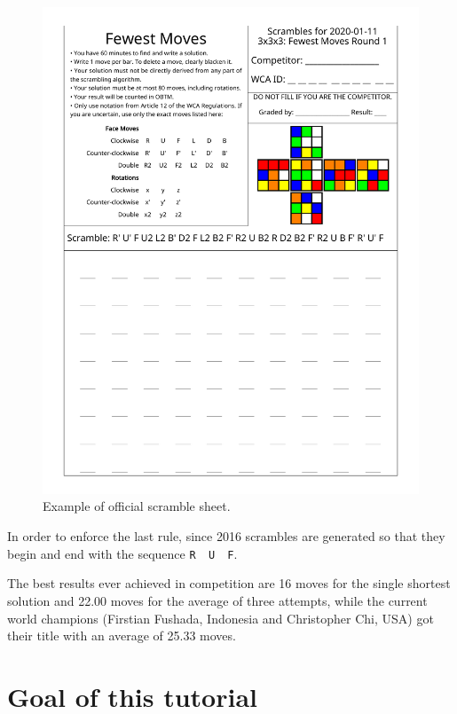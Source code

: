 \documentclass[11pt,a4paper]{book}
\newcommand{\p}{\textquotesingle}
\newcommand{\m}{\texttt}
\newcommand{\ps}{\p\,\,}
\begin{document}
\begin{figure}
\begin{center}
\includegraphics[scale=0.7]{img/example.pdf}
\end{center}
\caption{Example of official scramble sheet.}
\end{figure}

In order to enforce the last rule, since 2016 scrambles are generated so that they begin and end with the sequence \m{R\ps U\ps F}.

The best results ever achieved in competition are 16 moves for the single shortest solution and 22.00 moves for the average of three attempts, while the current world champions (Firstian Fushada, Indonesia and Christopher Chi, USA) got their title with an average of 25.33 moves.

\section*{Goal of this tutorial}
\end{document}
